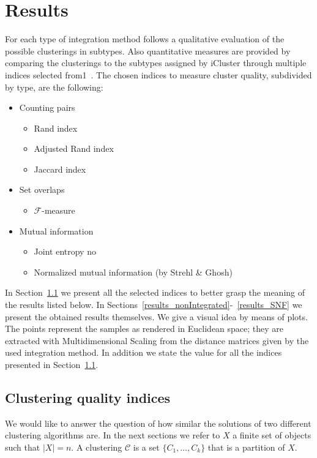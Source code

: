 \chapter{Results}
For each type of integration method follows a qualitative evaluation of the possible clusterings in subtypes. Also quantitative measures are provided by comparing the clusterings to the subtypes assigned by iCluster through multiple indices selected from1~\cite{wagner2007comparing}. The chosen indices to measure cluster quality, subdivided by type, are the following:
\begin{itemize}
    \item Counting pairs
    \begin{itemize}             
        \item Rand index
        \item Adjusted Rand index
        \item Jaccard index
    \end{itemize}
    \item Set overlaps
    \begin{itemize}
        \item $\mathcal{F}$-measure
    \end{itemize}
    \item Mutual information
    \begin{itemize}
        \item Joint entropy
no        \item Normalized mutual information (by Strehl \& Ghosh)
    \end{itemize}
\end{itemize}
In Section~\ref{results_indices} we present all the selected indices to better grasp the meaning of the results listed below. In Sections~\ref{results_nonIntegrated}-~\ref{results_SNF} we present the obtained results themselves. We give a visual idea by means of plots. The points represent the samples as rendered in Euclidean space; they are extracted with Multidimensional Scaling from the distance matrices given by the used integration method. In addition we state the value for all the indices presented in Section~\ref{results_indices}.

\section{Clustering quality indices}\label{results_indices}
We would like to answer the question of how similar the solutions of two different clustering algorithms are. In the next sections we refer to $X$ a finite set of objects such that $|X|=n$. A clustering $\mathcal{C}$ is a set $\{C_1,\dots,C_k\}$ that is a partition of $X$.

